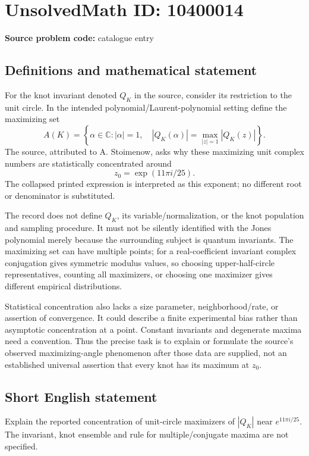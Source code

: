 \documentclass[11pt]{article}
\newcommand{\C}{\mathbb{C}}
\begin{document}
\section*{UnsolvedMath ID: 10400014}
\textbf{Source problem code:} catalogue entry
\subsection{Definitions and mathematical statement}
For the knot invariant denoted $Q_K$ in the source, consider its restriction to the unit circle. In the intended polynomial/Laurent-polynomial setting define the maximizing set
\[
A(K)=\left\{\alpha\in\C:|\alpha|=1,\quad
|Q_K(\alpha)|=\max_{|z|=1}|Q_K(z)|\right\}.
\]
The source, attributed to A. Stoimenow, asks why these maximizing unit complex numbers are statistically concentrated around
\[
z_0=\exp(11\pi i/25).
\]
The collapsed printed expression is interpreted as this exponent; no different root or denominator is substituted.

The record does not define $Q_K$, its variable/normalization, or the knot population and sampling procedure. It must not be silently identified with the Jones polynomial merely because the surrounding subject is quantum invariants. The maximizing set can have multiple points; for a real-coefficient invariant complex conjugation gives symmetric modulus values, so choosing upper-half-circle representatives, counting all maximizers, or choosing one maximizer gives different empirical distributions.

Statistical concentration also lacks a size parameter, neighborhood/rate, or assertion of convergence. It could describe a finite experimental bias rather than asymptotic concentration at a point. Constant invariants and degenerate maxima need a convention. Thus the precise task is to explain or formulate the source's observed maximizing-angle phenomenon after those data are supplied, not an established universal assertion that every knot has its maximum at $z_0$.
\subsection{Short English statement}
Explain the reported concentration of unit-circle maximizers of $|Q_K|$ near $e^{11\pi i/25}$. The invariant, knot ensemble and rule for multiple/conjugate maxima are not specified.
\end{document}
